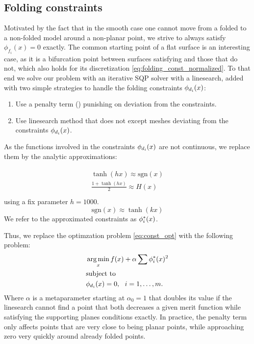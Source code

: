 \subsection{Folding constraints}
Motivated by the fact that in the smooth case one cannot move from a folded to a non-folded model around a non-planar point, we strive to always satisfy $\phi_{f_i}(x) = 0$ exactly. The common starting point of a flat surface is an interesting case, as it is a bifurcation point between surfaces satisfying  and those that do not, which also holds for its discretization \eqref{eq:folding_const_normalized}. To that end we solve our problem with an iterative SQP solver with a linesearch, added with two simple strategies to handle the folding constraints $\phi_{d_i}(x)$:
\begin{enumerate}
	\item Use a penalty term (\cite{nocedal}) punishing on deviation from the constraints. \label{opt:penalty}
	\item Use linesearch method that does not except meshes deviating from the constraints $\phi_{d_i}(x)$.
\end{enumerate}
As the functions involved in the constraints $\phi_{d_i}(x)$ are not continuous, we replace them by the analytic approximations:

\begin{align} 
\begin{split}\label{eq:const_inner}
\tanh(hx) \approx \text{sgn}(x) \\
\frac{1+\tanh(hx)}{2} \approx H(x)\\
\end{split}
\end{align}
using a fix parameter $h=1000$.
\begin{equation}
\text{sgn}(x) \approx \tanh(kx)
\end{equation}
We refer to the approximated constraints as $\phi^*_i(x)$.

Thus, we replace the optimzation problem \eqref{eq:const_opt} with the following problem:
\begin{equation} \label{eq:const_opt}
\begin{aligned}
& \operatorname*{arg\,min}_x f(x) + \alpha \sum \phi^*_i(x)^2 \\
& \textrm{subject to} \\
& \phi_{d_i}(x) = 0, \ \  i = 1, \ldots, m. \\ 
\end{aligned}
\end{equation}
Where $\alpha$ is a metaparameter starting at $\alpha_0 = 1$ that doubles its value if the linesearch cannot find a point that both decreases a given merit function while satisfying the supporting planes conditions exactly. In practice, the penalty term only affects points that are very close to being planar points, while approaching zero very quickly around already folded points.
